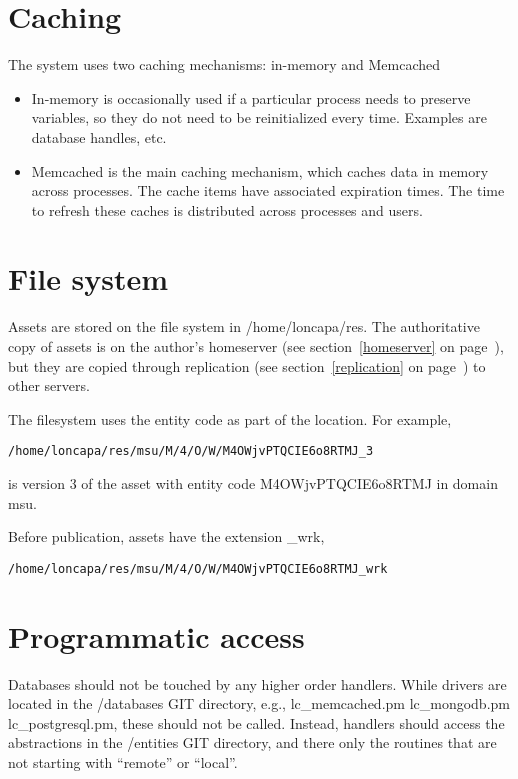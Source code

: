\section{Caching}
The system uses two caching mechanisms: in-memory and Memcached
\begin{itemize}
\item In-memory is occasionally used if a particular process needs to preserve variables, so they do not need to be reinitialized every time. Examples are database handles, etc.
\item Memcached is the main caching mechanism, which caches data in memory across processes. The cache items have associated expiration times. The time to refresh these caches is distributed across processes and users.
\end{itemize}
\section{File system}\label{resfilesystem}
Assets are stored on the file system in /home/loncapa/res. The authoritative copy of assets is on the author's homeserver (see section~\ref{homeserver} on page~\pageref{homeserver}), but they are copied through replication (see section~\ref{replication} on page~\pageref{replication}) to other servers.

The filesystem uses the entity code as part of the location. For example,
\begin{verbatim}
/home/loncapa/res/msu/M/4/O/W/M4OWjvPTQCIE6o8RTMJ_3
\end{verbatim}
is version 3 of the asset with entity code M4OWjvPTQCIE6o8RTMJ in domain msu.

Before publication, assets have the extension \_wrk,
\begin{verbatim}
/home/loncapa/res/msu/M/4/O/W/M4OWjvPTQCIE6o8RTMJ_wrk
\end{verbatim}

\section{Programmatic access}
Databases should not be touched by any higher order handlers. While drivers are located in the /databases GIT directory, e.g., lc\_memcached.pm  lc\_mongodb.pm  lc\_postgresql.pm, these should not be called. Instead, handlers should access the abstractions in the /entities GIT directory, and there only the routines that are not starting with ``remote'' or ``local''.
